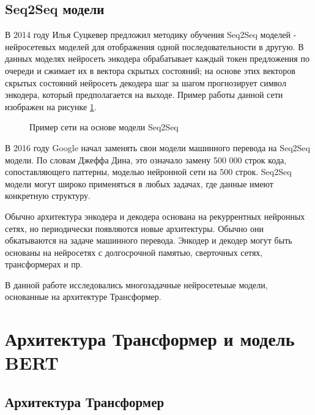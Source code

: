 \section{Seq2Seq  модели}
     В 2014 году Илья Суцкевер предложил методику обучения Seq2Seq моделей \cite{sutskever_2014} - нейросетевых моделей для отображения одной последовательности в другую. В данных моделях нейросеть энкодера обрабатывает каждый токен предложения по очереди  и сжимает их в вектора скрытых состояний; на основе этих векторов скрытых состояний нейросеть декодера шаг за шагом прогнозирует символ энкодера, который предполагается на выходе. Пример работы данной сети изображен на рисунке \ref{fig:Neuro6-Seq2Seq}.

\begin{figure}[ht]
  \caption{Пример сети на основе модели Seq2Seq}\label{fig:Neuro6-Seq2Seq}
\end{figure}


    В 2016 году Google начал заменять свои модели машинного перевода на Seq2Seq модели. По словам Джеффа Дина, это означало замену 500 000 строк кода, сопоставляющего паттерны,  моделью нейронной сети на 500 строк. Seq2Seq модели могут широко применяться в любых задачах, где данные имеют конкретную структуру.
    
Обычно архитектура энкодера и декодера основана на рекуррентных нейронных сетях, но периодически появляются новые архитектуры. Обычно они обкатываются на задаче машинного перевода. Энкодер и декодер могут быть основаны на нейросетях с долгосрочной памятью, сверточных сетях, трансформерах и пр.

В данной работе исследовались многозадачные нейросетеыые модели, основанные на архитектуре Трансформер. 

\chapter{Архитектура Трансформер и модель BERT}\label{ch:tr}

\section{Архитектура Трансформер}

